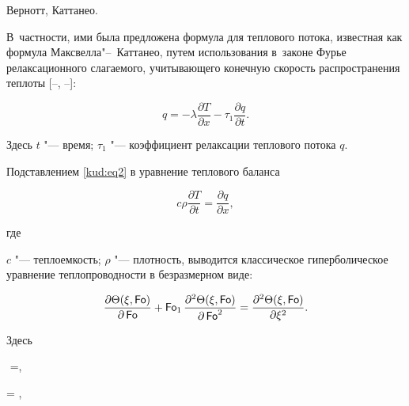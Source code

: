 Вернотт, Каттанео. 

В~частности, ими была предложена формула для теплового потока, известная как формула Максвелла"--~Каттанео, путем использования в~законе Фурье релаксационного слагаемого, учитывающего конечную скорость распространения теплоты [--,  --]:

\begin{equation}

\label{kud:eq2}

q=-\lambda \frac{\partial T}{\partial x}-\tau _1 \frac{\partial q}{\partial

t}.

\end{equation}

Здесь $t$ "--- время; $\tau _1$ "--- коэффициент релаксации теплового потока $q$.



Подставлением \eqref{kud:eq2} в уравнение теплового баланса

\begin{equation}

\label{kud:eq3}

c\rho \frac{ \partial T}{\partial t}= \frac{\partial q} {\partial x},

\end{equation}

где

$c$ "--- теплоемкость; $\rho $ "--- плотность, выводится классическое гиперболическое уравнение теплопроводности в безразмерном виде: %

\begin{equation}

\label{kud:eq4}

\frac{\partial \Theta(\xi, \operatorname{\sf Fo})}{\partial

\operatorname{\sf Fo}}+\operatorname{\sf Fo}_1 \frac{\partial^2\Theta (\xi , \operatorname{\sf Fo})}{\partial \operatorname{\sf Fo}^2}=\frac{\partial ^2 \Theta

(\xi, \operatorname{\sf Fo})}{\partial \xi^2}.

\end{equation}

Здесь

$$ \Theta=,\quad 

= ,\quad 

